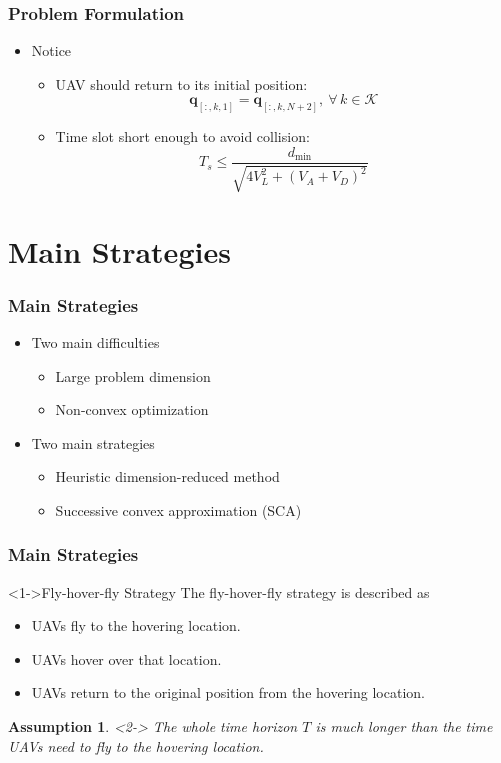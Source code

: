\documentclass[11.5pt]{beamer}
\newtheorem{assumption}{Assumption}
\begin{document}
\begin{frame}
	\frametitle{Problem Formulation}
	\begin{itemize}\itemsep4em
		\item<1-> Notice
		\begin{itemize}
			\item UAV should return to its initial position: 
				\begin{equation}\label{6.1}
					\boldsymbol{q}_{[:,k,1]} = \boldsymbol{q}_{[:,k,N+2]},\ \forall\,k\in\mathcal{K}\tag{6.1}
				\end{equation}
			\item Time slot short enough to avoid collision:
				\begin{equation}\label{6.2}
					T_s \leq \frac{d_{\min}}{\sqrt{4V_L^2+(V_A+V_D)^2}}\tag{6.2}
				\end{equation}
		\end{itemize}
	\end{itemize}
\end{frame}

\section{Main Strategies}
\begin{frame}
	\frametitle{Main Strategies}
	\begin{itemize}\itemsep4em
		\item<1-> Two main difficulties
		\begin{itemize}
			\item Large problem dimension
			\item Non-convex optimization
		\end{itemize}
		\item<2-> Two main strategies
		\begin{itemize}
			\item Heuristic dimension-reduced method
			\item Successive convex approximation (SCA)
		\end{itemize}
	\end{itemize}
\end{frame}


\begin{frame}
\frametitle{Main Strategies}
	\begin{block}<1->{Fly-hover-fly Strategy}
		The fly-hover-fly strategy is described as
		\begin{itemize}
			\item UAVs fly to the hovering location.
			\item UAVs hover over that location.
			\item UAVs return to the original position from the hovering location.
		\end{itemize}
	\end{block}
	\baselineskip
	\begin{assumption}<2->
		The whole time horizon $T$ is \alert{much longer} than the time UAVs need to fly to the hovering location.
	\end{assumption}
\end{frame}
\end{document}
